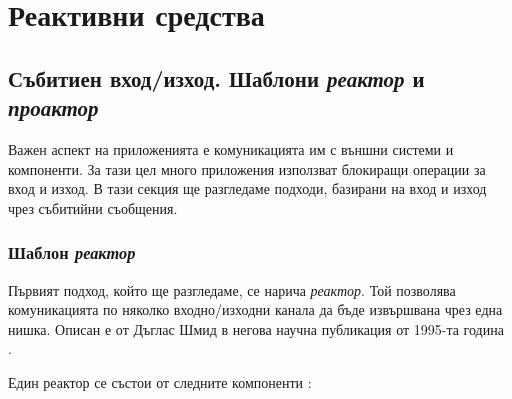 \chapter{Реактивни средства}

\section{Събитиен вход/изход. Шаблони \emph{реактор} и \emph{проактор}}

Важен аспект на приложенията е комуникацията им с външни системи и компоненти. За тази цел много приложения използват блокиращи операции за вход и изход. В тази секция ще разгледаме подходи, базирани на вход и изход чрез събитийни съобщения.

\subsection{Шаблон \emph{реактор}}
\label{sec:reactor-pattern}

Първият подход, който ще разгледаме, се нарича \emph{реактор}. Той позволява комуникацията по няколко входно/изходни канала да бъде извършвана чрез една нишка. Описан е от Дъглас Шмид в негова научна публикация от 1995-та година \cite{schmidt1995Reactor}.

Един реактор се състои от следните компоненти \cite{schmidt1995Reactor}:

